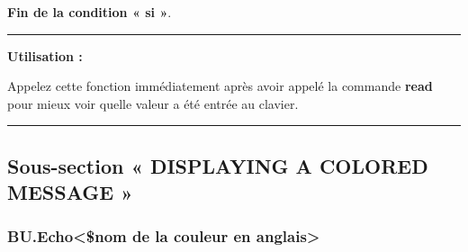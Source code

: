 \documentclass[a4paper,10pt]{article}
\begin{document}
    \begin{justify}
        \textbf{\color{cond}Fin de la condition « si »}.
    \end{justify}


    \par\noindent\rule{\textwidth}{0.4pt}

    \begin{justify}
        \textbf{Utilisation :}

        Appelez cette fonction immédiatement après avoir appelé la commande \textbf{\color{cmds}read} pour mieux voir quelle valeur a été entrée au clavier.
    \end{justify}




    \color{sec2}\par\noindent\rule{\textwidth}{0.4pt}\color{text}\setlength{\parskip}{1em}

    \color{sec2}
    \subsection{Sous-section « DISPLAYING A COLORED MESSAGE »}\color{text}

    \color{sec3}
    \subsubsection{BU.Echo<\$nom de la couleur en anglais>}\color{text}
\end{document}
